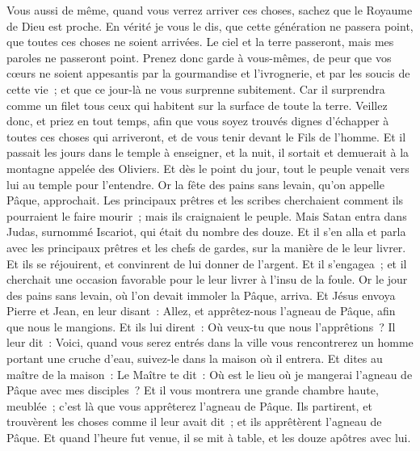 \begin{multicols}{2}
Vous aussi de même, quand vous verrez arriver ces choses, sachez que le Royaume de Dieu est proche.
En vérité je vous le dis, que cette génération ne passera point, que toutes ces choses ne soient arrivées.
Le ciel et la terre passeront, mais mes paroles ne passeront point.
Prenez donc garde à vous-mêmes, de peur que vos cœurs ne soient appesantis par la gourmandise et l'ivrognerie, et par les soucis de cette vie~; et que ce jour-là ne vous surprenne subitement.
Car il surprendra comme un filet tous ceux qui habitent sur la surface de toute la terre.
Veillez donc, et priez en tout temps, afin que vous soyez trouvés dignes d'échapper à toutes ces choses qui arriveront, et de vous tenir devant le Fils de l'homme.
Et il passait les jours dans le temple à enseigner, et la nuit, il sortait et demuerait à la montagne appelée des Oliviers.
Et dès le point du jour, tout le peuple venait vers lui au temple pour l'entendre.
\VerseOne{}Or la fête des pains sans levain, qu'on appelle Pâque, approchait.
Les principaux prêtres et les scribes cherchaient comment ils pourraient le faire mourir~; mais ils craignaient le peuple.
Mais Satan entra dans Judas, surnommé Iscariot, qui était du nombre des douze.
Et il s'en alla et parla avec les principaux prêtres et les chefs de gardes, sur la manière de le leur livrer.
Et ils se réjouirent, et convinrent de lui donner de l'argent.
Et il s'engagea~; et il cherchait une occasion favorable pour le leur livrer à l'insu de la foule.
Or le jour des pains sans levain, où l'on devait immoler la Pâque, arriva.
Et Jésus envoya Pierre et Jean, en leur disant~: Allez, et apprêtez-nous l'agneau de Pâque, afin que nous le mangions.
Et ils lui dirent~: Où veux-tu que nous l'apprêtions~?
Il leur dit~: Voici, quand vous serez entrés dans la ville vous rencontrerez un homme portant une cruche d'eau, suivez-le dans la maison où il entrera.
Et dites au maître de la maison~: Le Maître te dit~: Où est le lieu où je mangerai l'agneau de Pâque avec mes disciples~?
Et il vous montrera une grande chambre haute, meublée~; c'est là que vous apprêterez l'agneau de Pâque.
Ils partirent, et trouvèrent les choses comme il leur avait dit~; et ils apprêtèrent l'agneau de Pâque.
Et quand l'heure fut venue, il se mit à table, et les douze apôtres avec lui.

\end{multicols}
